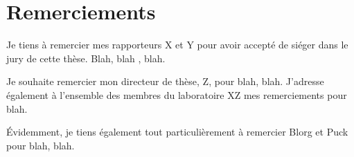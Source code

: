 \chapter*{Remerciements}

Je tiens à remercier mes rapporteurs X et Y pour avoir accepté de siéger dans le jury de cette thèse.
Blah, blah , blah.

Je souhaite remercier mon directeur de thèse, Z, pour blah, blah.
J'adresse également à l'ensemble des membres du laboratoire XZ mes remerciements pour blah.

Évidemment, je tiens également tout particulièrement à remercier Blorg et Puck pour blah, blah.
